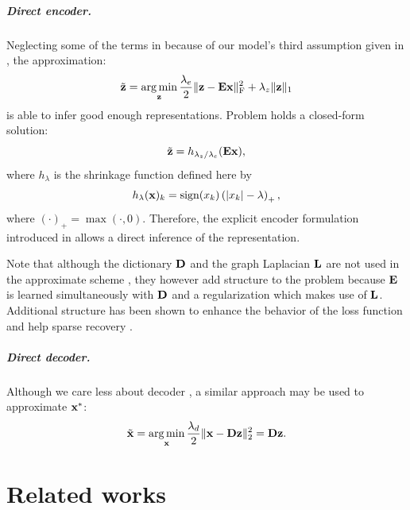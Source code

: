 \paragraph{Direct encoder.}
Neglecting some of the terms in  because of our model's third assumption given in , the approximation:
\begin{equation} \label{eqn:z_approximate}
	\tilde{\mathbf{z}} = \operatorname*{arg\,min}\limits_{\mathbf{z}} \frac{\lambda_e}{2} \| \mathbf{z} - \mathbf{E} \mathbf{x} \|_\text{F}^2 + \lambda_z \| \mathbf{z} \|_1
\end{equation}
is able to infer good enough representations. Problem  holds a closed-form solution:
\begin{equation} \label{eqn:z_direct}
	\tilde{\mathbf{z}} = h_{\lambda_z / \lambda_e} (\mathbf{E} \mathbf{x}),
\end{equation}
where $h_\lambda$ is the shrinkage function defined here by
\begin{equation} \label{eqn:shrinkage}
	h_\lambda(\mathbf{x})_k = \operatorname*{sign}(x_k) \left( |x_k| - \lambda \right)_+ ,
\end{equation}
where $(\cdot)_+ = \max(\cdot, 0)$. Therefore, the explicit encoder formulation introduced in  allows a direct inference of the representation.

Note that although the dictionary $\mathbf{D}$ and the graph Laplacian $\mathbf{L}$ are not used in the approximate scheme , they however add structure to the problem because $\mathbf{E}$ is learned simultaneously with $\mathbf{D}$ and a regularization which makes use of $\mathbf{L}$. Additional structure has been shown to enhance the behavior of the loss function and help sparse recovery \cite{kowalski2009sparse, baraniuk2010modelCS, huang2011LearningStructuredSparsity, jenatton2011structured}.

\paragraph{Direct decoder.}
Although we care less about decoder , a similar approach may be used to approximate $\mathbf{x}^*$:
\begin{equation} \label{eqn:x_direct}
	\tilde{\mathbf{x}} = \operatorname*{arg\,min}\limits_{\mathbf{x}} \frac{\lambda_d}{2} \| \mathbf{x} - \mathbf{D} \mathbf{z} \|_2^2 = \mathbf{D} \mathbf{z}.
\end{equation}

\chapter{Related works}

